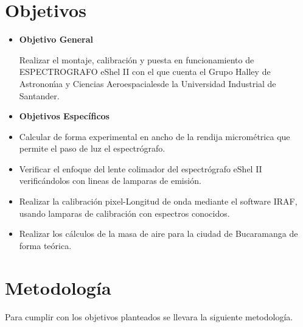 \documentclass[11pt]{article}
\begin{document}
\section{Objetivos}


\begin{itemize}
\item \textbf{Objetivo General}

Realizar el montaje, calibración y puesta en funcionamiento de ESPECTROGRAFO eShel II con el que cuenta el Grupo Halley de Astronoḿıa y Ciencias Aeroespacialesde la Universidad Industrial de Santander.\\

\item \textbf{Objetivos Espec\'ificos}
\end{itemize}

\begin{itemize}

\item Calcular de forma experimental en ancho de la rendija micrométrica que permite el paso de luz el espectrógrafo.

\item Verificar el enfoque del lente colimador del espectrógrafo eShel II verificándolos con lineas de lamparas de emisión.

\item Realizar la calibración pixel-Longitud de onda mediante el software IRAF, usando lamparas de calibración con espectros conocidos.

\item Realizar los cálculos de la masa de aire para la ciudad de Bucaramanga de forma teórica.

\end{itemize}




\newpage

\section{Metodolog\'ia}

Para cumplir con los objetivos planteados se llevara la siguiente metodología.
\end{document}
